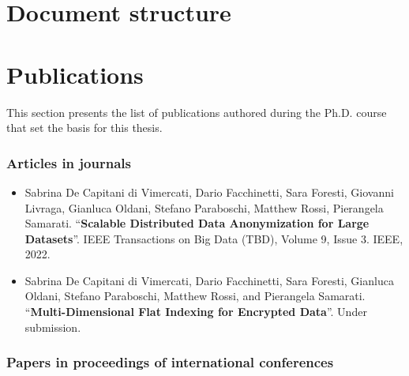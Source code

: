\section{Document structure}

\section{Publications}

This section presents the list of publications authored during the
Ph.D. course that set the basis for this thesis.

\subsubsection*{Articles in journals}

\begin{itemize}
    \nocite{scalable-mondrian}
    \item Sabrina De Capitani di Vimercati, Dario Facchinetti, Sara
        Foresti, Giovanni Livraga, Gianluca Oldani, Stefano
        Paraboschi, Matthew Rossi, Pierangela Samarati.
        ``\textbf{Scalable Distributed Data Anonymization for Large
        Datasets}''. IEEE Transactions on Big Data (TBD), Volume 9,
        Issue 3. IEEE, 2022.
    
    \nocite{k-flat}
    \item Sabrina De Capitani di Vimercati, Dario Facchinetti, Sara
        Foresti, Gianluca Oldani, Stefano Paraboschi, Matthew Rossi,
        and Pierangela Samarati. ``\textbf{Multi-Dimensional Flat
        Indexing for Encrypted Data}''. Under submission.
\end{itemize}

\subsubsection*{Papers in proceedings of international conferences}

